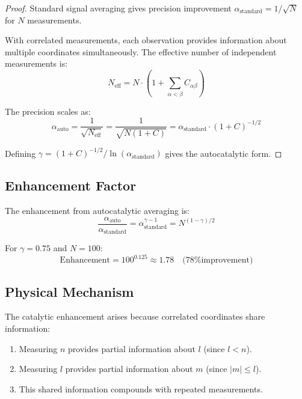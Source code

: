 \documentclass[twocolumn,10pt]{article}
\begin{document}
\begin{proof}
Standard signal averaging gives precision improvement $\alpha_{\text{standard}} = 1/\sqrt{N}$ for $N$ measurements.

With correlated measurements, each observation provides information about multiple coordinates simultaneously. The effective number of independent measurements is:
\begin{equation}
    N_{\text{eff}} = N \cdot (1 + \sum_{\alpha < \beta} C_{\alpha\beta})
\end{equation}

The precision scales as:
\begin{equation}
    \alpha_{\text{auto}} = \frac{1}{\sqrt{N_{\text{eff}}}} = \frac{1}{\sqrt{N(1 + C)}} = \alpha_{\text{standard}} \cdot (1 + C)^{-1/2}
\end{equation}

Defining $\gamma = (1 + C)^{-1/2} / \ln(\alpha_{\text{standard}})$ gives the autocatalytic form.
\end{proof}

\subsection{Enhancement Factor}

The enhancement from autocatalytic averaging is:
\begin{equation}
    \frac{\alpha_{\text{auto}}}{\alpha_{\text{standard}}} = \alpha_{\text{standard}}^{\gamma - 1} = N^{(1-\gamma)/2}
\end{equation}

For $\gamma = 0.75$ and $N = 100$:
\begin{equation}
    \text{Enhancement} = 100^{0.125} \approx 1.78 \quad \text{(78\% improvement)}
\end{equation}

\subsection{Physical Mechanism}

The catalytic enhancement arises because correlated coordinates share information:
\begin{enumerate}
    \item Measuring $n$ provides partial information about $l$ (since $l < n$).
    \item Measuring $l$ provides partial information about $m$ (since $|m| \leq l$).
    \item This shared information compounds with repeated measurements.
\end{enumerate}
\end{document}

